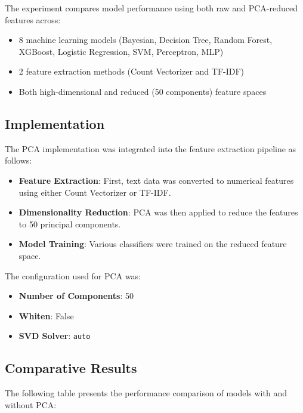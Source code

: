 The experiment compares model performance using both raw and PCA-reduced features across:
\begin{itemize}
    \item 8 machine learning models (Bayesian, Decision Tree, Random Forest, XGBoost, Logistic Regression, SVM, Perceptron, MLP)
    \item 2 feature extraction methods (Count Vectorizer and TF-IDF)
    \item Both high-dimensional and reduced (50 components) feature spaces
\end{itemize}

\subsection{Implementation}
The PCA implementation was integrated into the feature extraction pipeline as follows:

\begin{itemize}
    \item \textbf{Feature Extraction}: First, text data was converted to numerical features using either Count Vectorizer or TF-IDF.
    \item \textbf{Dimensionality Reduction}: PCA was then applied to reduce the features to 50 principal components.
    \item \textbf{Model Training}: Various classifiers were trained on the reduced feature space.
\end{itemize}

The configuration used for PCA was:
\begin{itemize}
    \item \textbf{Number of Components}: 50
    \item \textbf{Whiten}: False
    \item \textbf{SVD Solver}: \texttt{auto}
\end{itemize}

\subsection{Comparative Results}
The following table presents the performance comparison of models with and without PCA:

